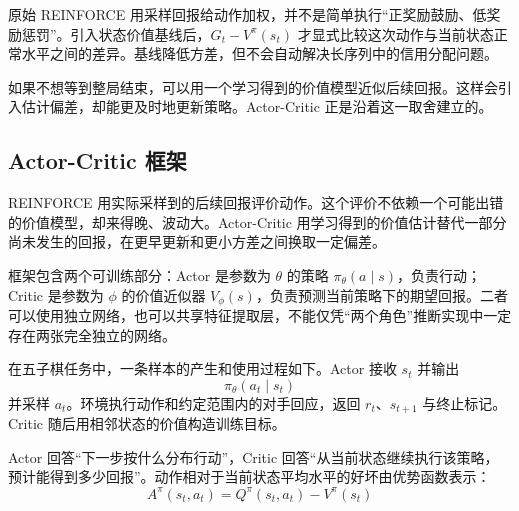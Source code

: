 \documentclass[UTF8,a4paper,zihao=-4,oneside,openany]{ctexbook}
\begin{document}
\begin{importantnote}
原始 REINFORCE 用采样回报给动作加权，并不是简单执行“正奖励鼓励、低奖励惩罚”。引入状态价值基线后，$G_t-V^\pi(s_t)$ 才显式比较这次动作与当前状态正常水平之间的差异。基线降低方差，但不会自动解决长序列中的信用分配问题。
\end{importantnote}

如果不想等到整局结束，可以用一个学习得到的价值模型近似后续回报。这样会引入估计偏差，却能更及时地更新策略。Actor-Critic 正是沿着这一取舍建立的。

\subsection{Actor-Critic 框架}

REINFORCE 用实际采样到的后续回报评价动作。这个评价不依赖一个可能出错的价值模型，却来得晚、波动大。Actor-Critic 用学习得到的价值估计替代一部分尚未发生的回报，在更早更新和更小方差之间换取一定偏差。

框架包含两个可训练部分：Actor 是参数为 $\theta$ 的策略 $\pi_\theta(a\mid s)$，负责行动；Critic 是参数为 $\phi$ 的价值近似器 $V_\phi(s)$，负责预测当前策略下的期望回报。二者可以使用独立网络，也可以共享特征提取层，不能仅凭“两个角色”推断实现中一定存在两张完全独立的网络。

在五子棋任务中，一条样本的产生和使用过程如下。Actor 接收 $s_t$ 并输出
\begin{equation}
\pi_{\theta}(a_t\mid s_t)
\end{equation}
并采样 $a_t$。环境执行动作和约定范围内的对手回应，返回 $r_t$、$s_{t+1}$ 与终止标记。Critic 随后用相邻状态的价值构造训练目标。

%       

Actor 回答“下一步按什么分布行动”，Critic 回答“从当前状态继续执行该策略，预计能得到多少回报”。动作相对于当前状态平均水平的好坏由优势函数表示：
\begin{equation}
A^{\pi}(s_t,a_t)
=
Q^{\pi}(s_t,a_t)
-
V^{\pi}(s_t)
\end{equation}
\end{document}
